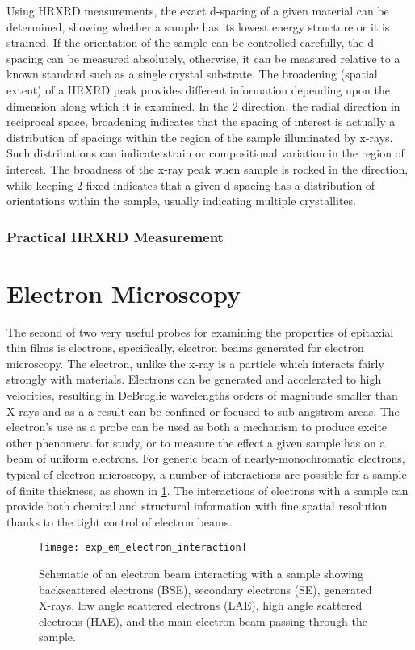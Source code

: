 Using HRXRD measurements, the exact d-spacing of a given material can be determined, showing whether a sample has its lowest energy structure or it is strained. If the orientation of the sample can be controlled carefully, the d-spacing can be measured absolutely, otherwise, it can be measured relative to a known standard such as a single crystal substrate. The broadening (spatial extent) of a HRXRD peak provides different information depending upon the dimension along which it is examined. In the 2\texttheta{} direction, the radial direction in reciprocal space, broadening indicates that the spacing of interest is actually a distribution of spacings within the region of the sample illuminated by x-rays. Such distributions can indicate strain or compositional variation in the region of interest. The broadness of the x-ray peak when sample is rocked in the \textomega{} direction, while keeping 2\texttheta{} fixed indicates that a given d-spacing has a distribution of orientations within the sample, usually indicating multiple crystallites.


\subsubsection{Practical HRXRD Measurement}

\section{Electron Microscopy}
The second of two very useful probes for examining the properties of epitaxial thin films is electrons, specifically, electron beams generated for electron microscopy. The electron, unlike the x-ray is a particle which interacts fairly strongly with materials. Electrons can be generated and accelerated to high velocities, resulting in DeBroglie wavelengths orders of magnitude smaller than X-rays and as a a result can be confined or focused to sub-angstrom areas. The electron's use as a probe can be used as both a mechanism to produce excite other phenomena for study, or to measure the effect a given sample has on a beam of uniform electrons. For generic beam of nearly-monochromatic electrons, typical of electron microscopy, a number of interactions are possible for a sample of finite thickness, as shown in \cref{fig:exp_em_electron_interaction}. The interactions of electrons with a sample can provide both chemical and structural information with fine spatial resolution thanks to the tight control of electron beams.
\begin{figure}
    \centering
    \texttt{[image: exp\_em\_electron\_interaction]}
    \caption{\label{fig:exp_em_electron_interaction}Schematic of an electron beam interacting with a sample showing backscattered electrons (BSE), secondary electrons (SE), generated X-rays, low angle scattered electrons (LAE), high angle scattered electrons (HAE), and the main electron beam passing through the sample.}
\end{figure}

